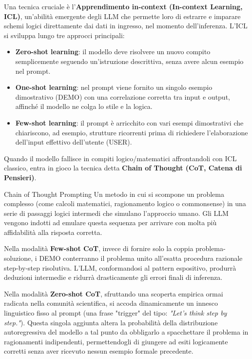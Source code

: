 Una tecnica cruciale è l'\textbf{Apprendimento in-context (In-context Learning, ICL)}, un'abilità emergente degli LLM che permette loro di estrarre e imparare schemi logici direttamente dai dati in ingresso, nel momento dell'inferenza.
L'ICL si sviluppa lungo tre approcci principali:
\begin{itemize}
\item \textbf{Zero-shot learning}: il modello deve risolvere un nuovo compito semplicemente seguendo un'istruzione descrittiva, senza avere alcun esempio nel prompt.
\item \textbf{One-shot learning}: nel prompt viene fornito un singolo esempio dimostrativo (DEMO) con una correlazione corretta tra input e output, affinché il modello ne colga lo stile e la logica.
\item \textbf{Few-shot learning}: il prompt è arricchito con vari esempi dimostrativi che chiariscono, ad esempio, strutture ricorrenti prima di richiedere l'elaborazione dell'input effettivo dell'utente (USER).
\end{itemize}

Quando il modello fallisce in compiti logico/matematici affrontandoli con ICL classico, entra in gioco la tecnica detta \textbf{Chain of Thought (CoT, Catena di Pensieri)}.
\begin{definition}{Chain of Thought Prompting}
Un metodo in cui si scompone un problema complesso (come calcoli matematici, ragionamento logico o commonsense) in una serie di passaggi logici intermedi che simulano l'approccio umano. Gli LLM vengono indotti ad emulare questa sequenza per arrivare con molta più affidabilità alla risposta corretta.
\end{definition}

Nella modalità \textbf{Few-shot CoT}, invece di fornire solo la coppia problema-soluzione, i DEMO conterranno il problema unito all'esatta procedura razionale step-by-step risolutiva. L'LLM, conformandosi al pattern espositivo, produrrà deduzioni intermedie e ridurrà drasticamente gli errori finali di inferenza.

Nella modalità \textbf{Zero-shot CoT}, sfruttando una scoperta empirica ormai radicata nella comunità scientifica, si accoda dinamicamente un innesco linguistico fisso al prompt (una frase "trigger" del tipo: \textit{"Let's think step by step."}). Questa singola aggiunta altera la probabilità della distribuzione autoregressiva del modello a tal punto da obbligarlo a spacchettare il problema in ragionamenti indipendenti, permettendogli di giungere ad esiti logicamente corretti senza aver ricevuto nessun esempio formale precedente.
